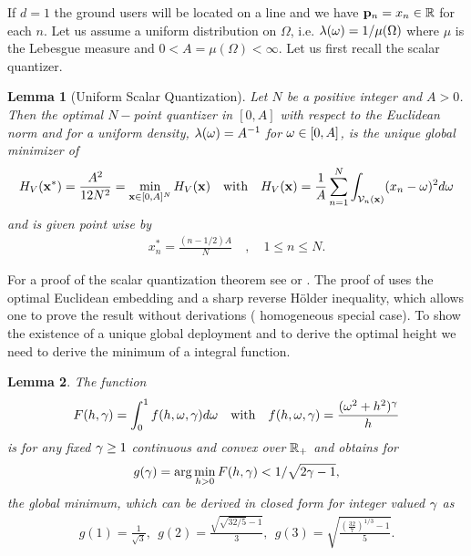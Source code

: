 \documentclass[smallabstract,smallcaptions]{dccpaper}
\newtheorem{lemma}{Lemma}
\newcommand{\df}{\ensuremath{\lam}}         %
\newcommand{\Vor}{\ensuremath{\mathcal{V}}}         %
\begin{document}
If $d=1$ the ground users will be located on a line and we have ${\mathbf p}_n=x_n\in{\ensuremath{\mathbb R}}$ for each $n$. Let us assume a uniform
distribution on $\Omega$, i.e.  $\df(\ome)=1/\mu(\Omega)$ where $\mu$ is the Lebesgue measure and
$0<A=\mu(\Omega)<\infty$. 
%
Let us first recall the scalar quantizer.
%
\begin{lemma}[Uniform Scalar Quantization]\label{lem:UniformScalarQuantizer}
  Let $N$ be a positive integer and $A>0$. Then the optimal $N-$point quantizer in $[0,A]$ with respect to the
  Euclidean norm and for a uniform density, $\lambda(\omega)=A^{-1}$ for $\omega\in[0,A]$,  is the unique global minimizer of
  \begin{align}
    H_V(\vx^*)=\frac{A^2}{12N^2}=\min_{\vx\in[0,A]^N} H_V(\vx) 
       \quad\text{with}\quad H_V(\vx)=\frac{1}{A}\sum_{n=1}^N \int_{\Vor_n(\vx)} (x_n-\ome)^2d\ome
  \end{align}
  and is given point wise by
  \begin{align}
    x_n^*= \frac{(n-1/2)A}{N} \quad, \quad 1\leq n\leq N.
  \end{align}
\end{lemma}
%
For a proof of the scalar quantization theorem see \cite{GN98} or
  \cite{Erdem}.  The proof of \cite[Thm.1]{Erdem} uses the optimal
  Euclidean  embedding and a sharp reverse Hölder inequality, which allows one to prove the result without derivations (
  homogeneous special case). 
\fi
%
To show the existence of a unique global deployment and to derive the optimal height we need to derive the minimum of a
integral function. 
%
\begin{lemma}\label{lem:ggam}
  The function 
  \begin{align}
    F(h,\gamma)=\int_0^1  f(h,\omega,\gamma) d\omega \quad\text{with}\quad f(h,\omega,\gamma)=\frac{(\omega^2+h^2)^{\gamma}}{h} 
  \end{align}
  is for any fixed $\gamma\geq 1$ continuous and convex over ${\mathbb R}_+$ and obtains for 
  \begin{align}
    g(\gamma)=\arg\min_{h>0} F(h,\gamma)<1/\sqrt{2\gamma-1},
  \end{align}
  the global minimum, which can be derived in closed form for integer valued $\gamma$ as 
  \begin{align}
    g(1) = \frac{1}{\sqrt{3}},\ \  g(2) = \frac{\sqrt{\sqrt{32/5}-1}}{3}, 
    \ \  g(3) = \sqrt{\frac{ (\frac{32}{7})^{1/3}-1}{5}}.\label{eq:ggam}
 \end{align}
\end{lemma}
\end{document}
